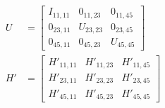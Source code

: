 \begin{align}\label{eqn:pertubationDegeneracy:330}
U &= 
\begin{bmatrix}
I_{11,11} & 0_{11, 23} & 0_{11,45} \\
0_{23,11} & U_{23, 23} & 0_{23,45} \\
0_{45,11} & 0_{45, 23} & U_{45,45} 
\end{bmatrix} \\
H' &= 
\begin{bmatrix}
{H'}_{11,11} & {H'}_{11, 23} & {H'}_{11,45} \\
{H'}_{23,11} & {H'}_{23, 23} & {H'}_{23,45} \\
{H'}_{45,11} & {H'}_{45, 23} & {H'}_{45,45} 
\end{bmatrix} \\
\end{align}

